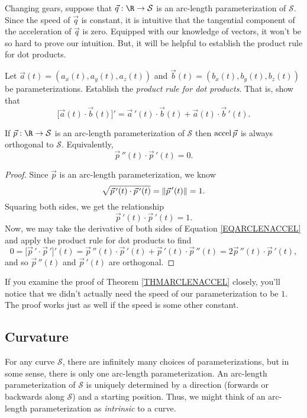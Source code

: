 Changing gears, suppose that $\vec q:\R\to\mathcal S$ is an arc-length parameterization 
of $\mathcal S$.  Since
the speed of $\vec q$ is constant, it is intuitive that the tangential component of 
the acceleration of $\vec q$ is zero.  Equipped with our knowledge of vectors, it won't be
so hard to prove our intuition.  But, it will be helpful to establish the product rule
for dot products.

\begin{exercise}
	Let $\vec a(t)=(a_x(t),a_y(t),a_z(t))$ and $\vec b(t)=(b_x(t),b_y(t),b_z(t))$ be parameterizations.
	Establish the \emph{product rule for dot products}.  That is,
	show that
	\[
		\Big[\vec a(t)\cdot \vec b(t)\Big]' = \vec a\,'(t)\cdot \vec b(t)+\vec a(t)\cdot \vec b\,'(t).
	\]
\end{exercise}

\begin{theorem}
	\label{THMARCLENACCEL}
	If $\vec p:\R\to\mathcal S$ is an arc-length parameterization of $\mathcal S$ then
	$\operatorname{accel}\vec p$ is always orthogonal to $\mathcal S$.  Equivalently,
	\[
		\vec p\,''(t)\cdot \vec p\,'(t)=0.
	\]
\end{theorem}
\begin{proof}
	Since $\vec p$ is an arc-length parameterization, we know 
	\[
		\sqrt{\vec p\,'(t)\cdot \vec p\,'(t)} = \lVert\vec p\,'(t)\rVert=1.
	\]
	Squaring both sides, we get the relationship
	\begin{equation}
		\label{EQARCLENACCEL}
		\vec p\,'(t)\cdot \vec p\,'(t)=1.
	\end{equation}
	Now, we may take the derivative of both sides of Equation \eqref{EQARCLENACCEL} and apply the
	product rule for dot products to find
	\[
		0=\big[\vec p\,'\cdot \vec p\,'\big]'(t) = \vec p\,''(t)\cdot \vec p\,'(t)+
		\vec p\,'(t)\cdot \vec p\,''(t) = 2\vec p\,''(t)\cdot \vec p\,'(t),
	\]
	and so $\vec p\,''(t)$ and $\vec p\,'(t)$ are orthogonal.
\end{proof}

If you examine the proof of Theorem \ref{THMARCLENACCEL} closely, you'll notice that we didn't
actually need the speed of our parameterization to be $1$.  The proof works just as well if
the speed is some other constant.

\subsection{Curvature}
For any curve $\mathcal S$, there are infinitely many choices of parameterizations, but in some
sense, there is only one arc-length parameterization.  An arc-length parameterization of
$\mathcal S$ is uniquely determined by a direction (forwards or backwards along $\mathcal S$)
and a starting position.  Thus, we might think of an arc-length parameterization as 
\emph{intrinsic} to a curve.

